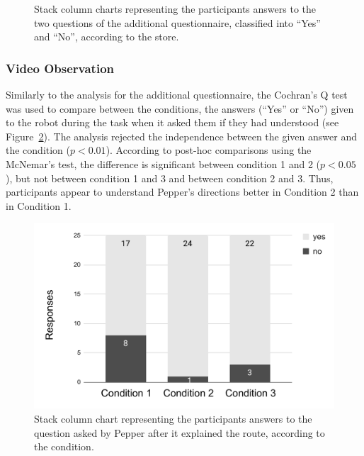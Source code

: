 \documentclass[a4paper,11pt,twoside]{StyleThese}
\begin{document}
\begin{figure}[!htb]
	\centering
	
	\hfill
	\caption{Stack column charts representing the participants answers to the two questions of the additional questionnaire, classified into ``Yes'' and ``No'', according to the store.}
	\label{chap8:fig:stores_comp_QA}
\end{figure} 


\subsubsection{Video Observation}
Similarly to the analysis for the additional questionnaire, the Cochran's Q test was used to compare between the conditions, the answers (``Yes'' or ``No'') given to the robot during the task when it asked them if they had understood (see Figure~\ref{chap8:fig:comp_video}). The analysis rejected the independence between the given answer and the condition ($p<0.01$). According to post-hoc comparisons using the McNemar's test, the difference is significant between condition 1 and 2 ($p<0.05$), but not between condition 1 and 3 and between condition 2 and 3. Thus, participants appear to understand Pepper's directions better in Condition 2 than in Condition 1.

\begin{figure}[!hbt]
	\centering
	\includegraphics[width=0.49\linewidth]{figures/chapter3/resp_video.pdf}
	\caption{Stack column chart representing the participants answers to the question asked by Pepper after it explained the route, according to the condition.}
	\label{chap8:fig:comp_video}
\end{figure} 
\end{document}
